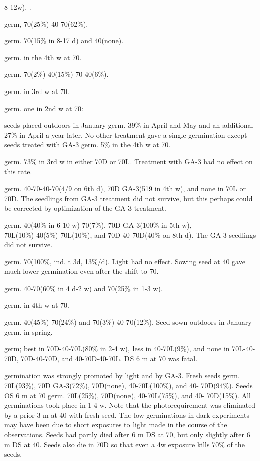 \begin{description}
8-12w). .
\item[G. farreri] germ, 70(25\%)-40-70(62\%).
\item[G. fischeri] germ. 70(15\% in 8-17 d) and 40(none).
\item[G. flavida] germ. in the 4th w at 70.
\item[G. gelida] germ. 70(2\%)-40(15\%)-70-40(6\%).
\item[G. lagodechiana] germ. in 3rd w at 70.
\item[G. loderi] germ. one in 2nd w at 70:
\item[G. lutea] seeds placed outdoors in January germ. 39\% in April and May and an
additional 27\% in April a year later. No other treatment gave a single germination
except seeds treated with GA-3 germ. 5\% in the 4th w at 70.
\item[G. macrophylla] germ. 73\% in 3rd w in either 70D or 70L. Treatment with GA-3
had no effect on this rate.
\item[G. occidentalis] germ. 40-70-40-70(4/9 on 6th d), 70D GA-3(519 in 4th w), and
none in 70L or 70D. The seedlings from GA-3 treatment did not survive, but this
perhaps could be corrected by optimization of the GA-3 treatment.
\item[G. paradoxa] germ. 40(40\% in 6-10 w)-70(7\%), 70D GA-3(100\% in 5th w),
70L(10\%)-40(5\%)-70L(10\%), and 70D-40-70D(40\% on 8th d). The GA-3 seedlings
did not survive.
\item[G. parryi] germ. 70(100\%, ind. t 3d, 13\%/d). Light had no effect. Sowing seed
at 40 gave much lower germination even after the shift to 70.
\item[G. pseudoaquatica] germ. 40-70(60\% in 4 d-2 w) and 70(25\% in 1-3 w).
\item[G. pterocalyx] germ. in 4th w at 70.
\item[G. puberulenta] germ. 40(45\%)-70(24\%) and 70(3\%)-40-70(12\%). Seed sown
outdoors in January germ. in spring.
\item[G. saponaria] germ; best in 70D-40-70L(80\% in 2-4 w), less in 40-70L(9\%), and
none in 70L-40-70D, 70D-40-70D, and 40-70D-40-70L. DS 6 m at 70 was fatal.
\item[G. scabra] germination was strongly promoted by light and by GA-3. Fresh
seeds germ. 70L(93\%), 70D GA-3(72\%), 70D(none), 40-70L(100\%), and 40-
70D(94\%). Seeds OS 6 m at 70 germ. 70L(25\%), 70D(none), 40-70L(75\%), and 40-
70D(15\%). All germinations took place in 1-4 w. Note that the photorequirement was
eliminated by a prior 3 m at 40 with fresh seed. The low germinations in dark
experiments may have been due to short exposures to light made in the course of the
observations. Seeds had partly died after 6 m DS at 70, but only slightly after 6 m DS
at 40. Seeds also die in 70D so that even a 4w exposure kills 70\% of the seeds.


\end{description}
